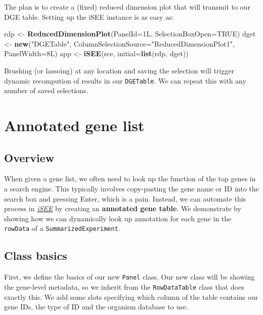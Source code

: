 \documentclass[]{book}
\newenvironment{Shaded}{\begin{snugshade}}{\end{snugshade}}
\newcommand{\KeywordTok}[1]{\textcolor[rgb]{0.13,0.29,0.53}{\textbf{#1}}}
\newcommand{\DataTypeTok}[1]{\textcolor[rgb]{0.13,0.29,0.53}{#1}}
\newcommand{\StringTok}[1]{\textcolor[rgb]{0.31,0.60,0.02}{#1}}
\newcommand{\OtherTok}[1]{\textcolor[rgb]{0.56,0.35,0.01}{#1}}
\newcommand{\NormalTok}[1]{#1}
\begin{document}
The plan is to create a (fixed) reduced dimension plot that will
transmit to our DGE table. Setting up the iSEE instance is as easy as:

\begin{Shaded}
\begin{Highlighting}[]
\NormalTok{rdp <-}\StringTok{ }\KeywordTok{ReducedDimensionPlot}\NormalTok{(}\DataTypeTok{PanelId=}\NormalTok{1L, }\DataTypeTok{SelectionBoxOpen=}\OtherTok{TRUE}\NormalTok{)}
\NormalTok{dget <-}\StringTok{ }\KeywordTok{new}\NormalTok{(}\StringTok{"DGETable"}\NormalTok{, }\DataTypeTok{ColumnSelectionSource=}\StringTok{"ReducedDimensionPlot1"}\NormalTok{, }\DataTypeTok{PanelWidth=}\NormalTok{8L)}
\NormalTok{app <-}\StringTok{ }\KeywordTok{iSEE}\NormalTok{(sce, }\DataTypeTok{initial=}\KeywordTok{list}\NormalTok{(rdp, dget))}
\end{Highlighting}
\end{Shaded}

Brushing (or lassoing) at any location and saving the selection will
trigger dynamic recompution of results in our \texttt{DGETable}. We can
repeat this with any number of saved selections.

\chapter{Annotated gene list}\label{annotated-gene-list}

\section{Overview}\label{overview-3}

When given a gene list, we often need to look up the function of the top
genes in a search engine. This typically involves copy-pasting the gene
name or ID into the search box and pressing Enter, which is a pain.
Instead, we can automate this process in
\emph{\href{https://bioconductor.org/packages/3.11/iSEE}{iSEE}} by
creating an \textbf{annotated gene table}. We demonstrate by showing how
we can dynamically look up annotation for each gene in the
\texttt{rowData} of a \texttt{SummarizedExperiment}.

\section{Class basics}\label{class-basics-2}

First, we define the basics of our new \texttt{Panel} class. Our new
class will be showing the gene-level metadata, so we inherit from the
\texttt{RowDataTable} class that does exactly this. We add some slots
specifying which column of the table contains our gene IDs, the type of
ID and the organism database to use.
\end{document}
